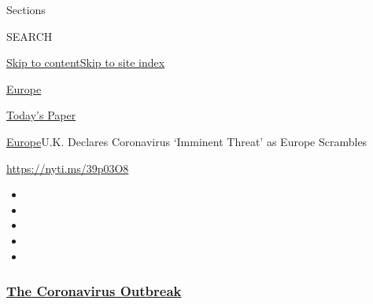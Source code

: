 Sections

SEARCH

\protect\hyperlink{site-content}{Skip to
content}\protect\hyperlink{site-index}{Skip to site index}

\href{https://www.nytimes3xbfgragh.onion/section/world/europe}{Europe}

\href{https://myaccount.nytimes3xbfgragh.onion/auth/login?response_type=cookie\&client_id=vi}{}

\href{https://www.nytimes3xbfgragh.onion/section/todayspaper}{Today's
Paper}

\href{/section/world/europe}{Europe}\textbar{}U.K. Declares Coronavirus
`Imminent Threat' as Europe Scrambles

\url{https://nyti.ms/39p03O8}

\begin{itemize}
\item
\item
\item
\item
\item
\end{itemize}

\hypertarget{the-coronavirus-outbreak}{%
\subsubsection{\texorpdfstring{\href{https://www.nytimes3xbfgragh.onion/news-event/coronavirus?name=styln-coronavirus-national\&region=TOP_BANNER\&block=storyline_menu_recirc\&action=click\&pgtype=Article\&impression_id=92faac00-f1ce-11ea-b607-5f01091b4cf2\&variant=undefined}{The
Coronavirus
Outbreak}}{The Coronavirus Outbreak}}\label{the-coronavirus-outbreak}}

